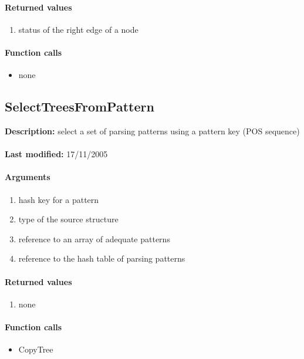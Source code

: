 \paragraph{Returned values}
\begin{enumerate}
\item status of the right edge of a node
\end{enumerate}

\paragraph{Function calls}
\begin{itemize}
\item none
\end{itemize}

\subsection{SelectTreesFromPattern}
\textbf{Description:} select a set of parsing patterns using a pattern key (POS sequence)\\
\\\textbf{Last modified:} 17/11/2005

\paragraph{Arguments}
\begin{enumerate}
\item hash key for a pattern
\item type of the source structure
\item reference to an array of adequate patterns
\item reference to the hash table of parsing patterns
\end{enumerate}

\paragraph{Returned values}
\begin{enumerate}
\item none
\end{enumerate}

\paragraph{Function calls}
\begin{itemize}
\item CopyTree
\end{itemize}

